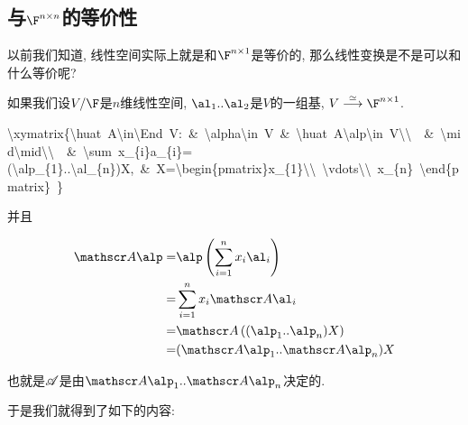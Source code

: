 \subsection{与$\protect\F^{n\times n}$的等价性}

以前我们知道, 线性空间实际上就是和$\F^{n\times1}$是等价的, 那么线性变换是不是可以和什么等价呢? 

如果我们设$V/\F$是$n$维线性空间, $\al_{1}..\al_{2}$是$V$的一组基, $V\stackrel{\simeq}{\longrightarrow}\F^{n\times1}$. 
\begin{lyxcode}
\textbackslash xymatrix\{\textbackslash huat~A\textbackslash in\textbackslash End~V:~\&~\textbackslash alpha\textbackslash in~V~\&~\textbackslash huat~A\textbackslash alp\textbackslash in~V\textbackslash\textbackslash ~~\&~\textbackslash mid\textbackslash mid\textbackslash\textbackslash ~~\&~\textbackslash sum~x\_\{i\}a\_\{i\}=(\textbackslash alp\_\{1\}..\textbackslash al\_\{n\})X,~\&~X=\textbackslash begin\{pmatrix\}x\_\{1\}\textbackslash\textbackslash ~\textbackslash vdots\textbackslash\textbackslash ~x\_\{n\}~\textbackslash end\{pmatrix\}~\}~
\end{lyxcode}

%
并且

\begin{align*}
\huat A\alp= & \alp\left(\sum_{i=1}^{n}x_{i}\al_{i}\right)\\
= & \sum_{i=1}^{n}x_{i}\huat A\al_{i}\\
= & \huat A\left((\alp_{1}..\alp_{n})X\right)\\
= & (\huat A\alp_{1}..\huat A\alp_{n})X
\end{align*}

也就是$\mathscr{A}$是由$\huat A\alp_{1}..\huat A\alp_{n}$决定的. 

于是我们就得到了如下的内容: 

\noindent{}

